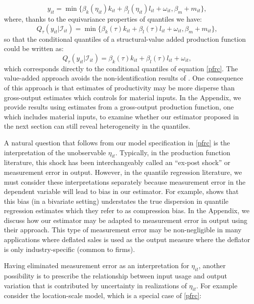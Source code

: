\documentclass[11pt]{article}
\begin{document}
\begin{equation*} 
y_{it}=\min\{\beta_{k}(\eta_{it})k_{it}+\beta_{l}(\eta_{it})l_{it}+\omega_{it}, \beta_{m}+m_{it}\},
\end{equation*}
where, thanks to the equivariance properties of quantiles we have:
\begin{equation*} 
Q_{\tau}(y_{it}|\mathcal{I}_{it})=\min\{\beta_{k}(\tau)k_{it}+\beta_{l}(\tau)l_{it}+\omega_{it}, \beta_{m}+m_{it}\},
\end{equation*}
so that the conditional quantiles of a structural-value added production function could be written as:
\begin{equation*}
Q_{\tau}(y_{it}|\mathcal{I}_{it})=\beta_{k}(\tau)k_{it}+\beta_{l}(\tau)l_{it}+\omega_{it},
\end{equation*}
which corresponds directly to the conditional quantiles of equation \ref{pfrc}. The value-added approach avoids the non-identification results of \cite{Gandhi2020}. One consequence of this approach is that estimates of productivity may be more disperse than gross-output estimates which controls for material inputs. In the Appendix, we provide results using estimates from a gross-output production function, one which includes material inputs, to examine whether our estimator proposed in the next section can still reveal heterogeneity in the quantiles.

A natural question that follows from our model specification in \ref{pfrc} is the interpretation of the unobservable $\eta_{it}$. Typically, in the production function literature, this shock has been interchangeably called an ``ex-post shock'' or measurement error in output. However, in the quantile regression literature, we must consider these interpretations separately because measurement error in the dependent variable will lead to bias in our estimator. For example, \cite{Hausman2021} shows that this bias (in a bivariate setting) understates the true dispersion in quantile regression estimates which they refer to as compression bias. In the Appendix, we discuss how our estimator may be adapted to measurement error in output using their approach. This type of measurement error may be non-negligible in many applications where deflated sales is used as the output measure where the deflator is only industry-specific (common to firms). 

Having eliminated measurement error as an interpretation for $\eta_{it}$, another possibility is to prescribe the relationship between input usage and output variation that is contributed by uncertainty in realizations of $\eta_{it}$. For example consider the location-scale model, which is a special case of \eqref{pfrc}:
\end{document}
